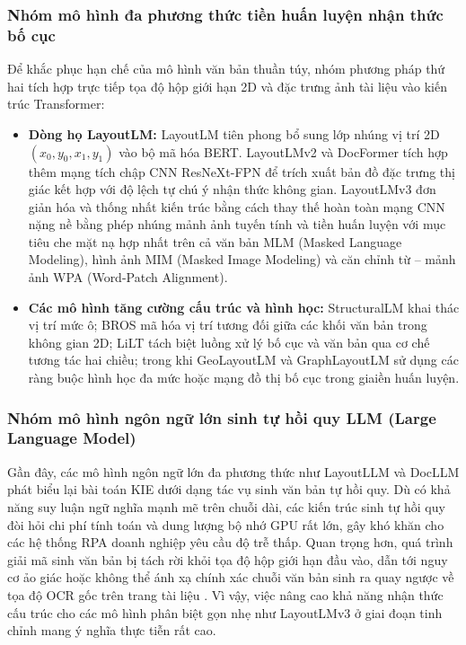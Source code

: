 \subsubsection{Nhóm mô hình đa phương thức tiền huấn luyện nhận thức bố cục}
Để khắc phục hạn chế của mô hình văn bản thuần túy, nhóm phương pháp thứ hai tích hợp trực tiếp tọa độ hộp giới hạn 2D và đặc trưng ảnh tài liệu vào kiến trúc Transformer:
\begin{itemize}
    \item \textbf{Dòng họ LayoutLM:} LayoutLM \cite{xu2020layoutlm} tiên phong bổ sung lớp nhúng vị trí 2D $(x_0, y_0, x_1, y_1)$ vào bộ mã hóa BERT. LayoutLMv2 \cite{xu2021layoutlmv2} và DocFormer \cite{appalaraju2021docformer} tích hợp thêm mạng tích chập CNN ResNeXt-FPN để trích xuất bản đồ đặc trưng thị giác kết hợp với độ lệch tự chú ý nhận thức không gian. LayoutLMv3 \cite{huang2022layoutlmv3} đơn giản hóa và thống nhất kiến trúc bằng cách thay thế hoàn toàn mạng CNN nặng nề bằng phép nhúng mảnh ảnh tuyến tính và tiền huấn luyện với mục tiêu che mặt nạ hợp nhất trên cả văn bản MLM (Masked Language Modeling), hình ảnh MIM (Masked Image Modeling) và căn chỉnh từ -- mảnh ảnh WPA (Word-Patch Alignment).
    \item \textbf{Các mô hình tăng cường cấu trúc và hình học:} StructuralLM \cite{li2021structurallm} khai thác vị trí mức ô; BROS \cite{hong2022bros} mã hóa vị trí tương đối giữa các khối văn bản trong không gian 2D; LiLT \cite{wang2022lilt} tách biệt luồng xử lý bố cục và văn bản qua cơ chế tương tác hai chiều; trong khi GeoLayoutLM \cite{luo2023geolayoutlm} và GraphLayoutLM \cite{li2023graphlayoutlm} sử dụng các ràng buộc hình học đa mức hoặc mạng đồ thị bố cục trong giaiền huấn luyện.
\end{itemize}

\subsubsection{Nhóm mô hình ngôn ngữ lớn sinh tự hồi quy LLM (Large Language Model)}
Gần đây, các mô hình ngôn ngữ lớn đa phương thức như LayoutLLM \cite{luo2024layoutllm} và DocLLM \cite{wang2024docllm} phát biểu lại bài toán KIE dưới dạng tác vụ sinh văn bản tự hồi quy. Dù có khả năng suy luận ngữ nghĩa mạnh mẽ trên chuỗi dài, các kiến trúc sinh tự hồi quy đòi hỏi chi phí tính toán và dung lượng bộ nhớ GPU rất lớn, gây khó khăn cho các hệ thống RPA doanh nghiệp yêu cầu độ trễ thấp. Quan trọng hơn, quá trình giải mã sinh văn bản bị tách rời khỏi tọa độ hộp giới hạn đầu vào, dẫn tới nguy cơ ảo giác hoặc không thể ánh xạ chính xác chuỗi văn bản sinh ra quay ngược về tọa độ OCR gốc trên trang tài liệu \cite{wang2024docllm, luo2024layoutllm}. Vì vậy, việc nâng cao khả năng nhận thức cấu trúc cho các mô hình phân biệt gọn nhẹ như LayoutLMv3 ở giai đoạn tinh chỉnh mang ý nghĩa thực tiễn rất cao.

